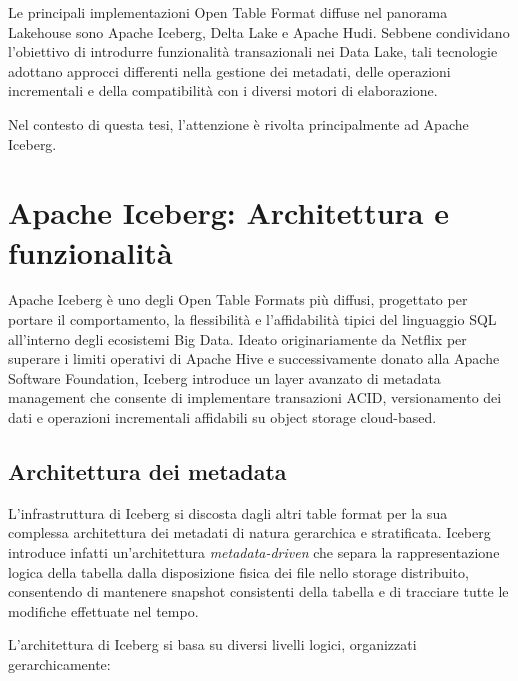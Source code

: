 \documentclass[12pt,a4paper,openright,twoside]{book}
\begin{document}
Le principali implementazioni Open Table Format diffuse nel panorama Lakehouse sono Apache Iceberg, Delta Lake e Apache Hudi. 
Sebbene condividano l’obiettivo di introdurre funzionalità transazionali nei Data Lake, tali tecnologie adottano approcci differenti nella gestione dei metadati, delle operazioni incrementali e della compatibilità con i diversi motori di elaborazione.

Nel contesto di questa tesi, l’attenzione è rivolta principalmente ad Apache Iceberg.

\newpage

\section{Apache Iceberg: Architettura e funzionalità}
Apache Iceberg è uno degli Open Table Formats più diffusi, progettato per portare il comportamento, la flessibilità e l'affidabilità tipici del linguaggio SQL all'interno degli ecosistemi Big Data. 
Ideato originariamente da Netflix per superare i limiti operativi di Apache Hive e successivamente donato alla Apache Software Foundation, 
Iceberg introduce un layer avanzato di metadata management che consente di implementare transazioni ACID, versionamento dei dati e operazioni incrementali affidabili su object storage cloud-based. \cite{saha2024disruptor}

\subsection{Architettura dei metadata}
L'infrastruttura di Iceberg si discosta dagli altri table format per la sua complessa architettura dei metadati di natura gerarchica e stratificata.
Iceberg introduce infatti un’architettura \textit{metadata-driven} che separa la rappresentazione logica della tabella dalla disposizione fisica dei file nello storage distribuito,
consentendo di mantenere snapshot consistenti della tabella e di tracciare tutte le modifiche effettuate nel tempo.

L’architettura di Iceberg si basa su diversi livelli logici, organizzati gerarchicamente:
\end{document}
